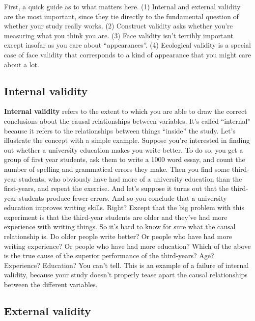 \documentclass[
  a4paper,
]{book}
\begin{document}
First, a quick guide as to what matters here. (1) Internal and external
validity are the most important, since they tie directly to the
fundamental question of whether your study really works. (2) Construct
validity asks whether you're measuring what you think you are. (3) Face
validity isn't terribly important except insofar as you care about
``appearances''. (4) Ecological validity is a special case of face
validity that corresponds to a kind of appearance that you might care
about a lot.

\hypertarget{internal-validity}{%
\subsection{Internal validity}\label{internal-validity}}

\textbf{Internal validity} refers to the extent to which you are able to
draw the correct conclusions about the causal relationships between
variables. It's called ``internal'' because it refers to the
relationships between things ``inside'' the study. Let's illustrate the
concept with a simple example. Suppose you're interested in finding out
whether a university education makes you write better. To do so, you get
a group of first year students, ask them to write a 1000 word essay, and
count the number of spelling and grammatical errors they make. Then you
find some third-year students, who obviously have had more of a
university education than the first-years, and repeat the exercise. And
let's suppose it turns out that the third-year students produce fewer
errors. And so you conclude that a university education improves writing
skills. Right? Except that the big problem with this experiment is that
the third-year students are older and they've had more experience with
writing things. So it's hard to know for sure what the causal
relationship is. Do older people write better? Or people who have had
more writing experience? Or people who have had more education? Which of
the above is the true cause of the superior performance of the
third-years? Age? Experience? Education? You can't tell. This is an
example of a failure of internal validity, because your study doesn't
properly tease apart the causal relationships between the different
variables.

\hypertarget{external-validity}{%
\subsection{External validity}\label{external-validity}}
\end{document}
